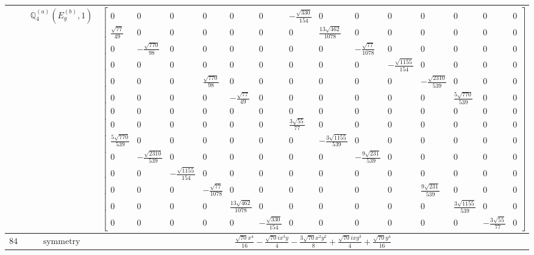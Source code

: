 \documentclass[fleqn,8pt,landscape]{jsarticle}
\begin{document}
\begin{longtable}{ccc}
$  $ & $ \mathbb{Q}_{4}^{(a)}(E_{g}^{(b)},1) $ & $ \begin{bmatrix} 0 & 0 & 0 & 0 & 0 & 0 & - \frac{\sqrt{330}}{154} & 0 & 0 & 0 & 0 & 0 & 0 & 0 \\ \frac{\sqrt{77}}{49} & 0 & 0 & 0 & 0 & 0 & 0 & \frac{13 \sqrt{462}}{1078} & 0 & 0 & 0 & 0 & 0 & 0 \\ 0 & - \frac{\sqrt{770}}{98} & 0 & 0 & 0 & 0 & 0 & 0 & - \frac{\sqrt{77}}{1078} & 0 & 0 & 0 & 0 & 0 \\ 0 & 0 & 0 & 0 & 0 & 0 & 0 & 0 & 0 & - \frac{\sqrt{1155}}{154} & 0 & 0 & 0 & 0 \\ 0 & 0 & 0 & \frac{\sqrt{770}}{98} & 0 & 0 & 0 & 0 & 0 & 0 & - \frac{\sqrt{2310}}{539} & 0 & 0 & 0 \\ 0 & 0 & 0 & 0 & - \frac{\sqrt{77}}{49} & 0 & 0 & 0 & 0 & 0 & 0 & \frac{5 \sqrt{770}}{539} & 0 & 0 \\ 0 & 0 & 0 & 0 & 0 & 0 & 0 & 0 & 0 & 0 & 0 & 0 & 0 & 0 \\ 0 & 0 & 0 & 0 & 0 & 0 & \frac{3 \sqrt{55}}{77} & 0 & 0 & 0 & 0 & 0 & 0 & 0 \\ \frac{5 \sqrt{770}}{539} & 0 & 0 & 0 & 0 & 0 & 0 & - \frac{3 \sqrt{1155}}{539} & 0 & 0 & 0 & 0 & 0 & 0 \\ 0 & - \frac{\sqrt{2310}}{539} & 0 & 0 & 0 & 0 & 0 & 0 & - \frac{9 \sqrt{231}}{539} & 0 & 0 & 0 & 0 & 0 \\ 0 & 0 & - \frac{\sqrt{1155}}{154} & 0 & 0 & 0 & 0 & 0 & 0 & 0 & 0 & 0 & 0 & 0 \\ 0 & 0 & 0 & - \frac{\sqrt{77}}{1078} & 0 & 0 & 0 & 0 & 0 & 0 & \frac{9 \sqrt{231}}{539} & 0 & 0 & 0 \\ 0 & 0 & 0 & 0 & \frac{13 \sqrt{462}}{1078} & 0 & 0 & 0 & 0 & 0 & 0 & \frac{3 \sqrt{1155}}{539} & 0 & 0 \\ 0 & 0 & 0 & 0 & 0 & - \frac{\sqrt{330}}{154} & 0 & 0 & 0 & 0 & 0 & 0 & - \frac{3 \sqrt{55}}{77} & 0 \end{bmatrix} $ \\ \hline
$ 842 $ & $ \text{symmetry} $ & $ \frac{\sqrt{70} x^{4}}{16} - \frac{\sqrt{70} i x^{3} y}{4} - \frac{3 \sqrt{70} x^{2} y^{2}}{8} + \frac{\sqrt{70} i x y^{3}}{4} + \frac{\sqrt{70} y^{4}}{16} $ \\

\end{longtable}
\end{document}
